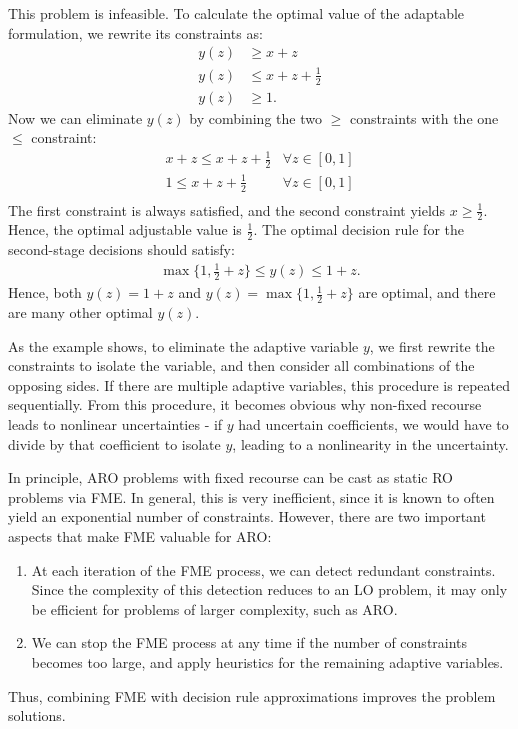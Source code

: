 This problem is infeasible. To calculate the optimal value of the adaptable formulation, we rewrite its constraints as:
\begin{align}
y(z) &\geq x + z \\
y(z) &\leq x+z+\frac{1}{2}\\
y(z) &\geq 1.
\end{align}
Now we can eliminate $y(z)$ by combining the two $\geq$ constraints with the one $\leq$ constraint:
\begin{align}
 x + z \leq x+z+\frac{1}{2} &\forall z\in [0,1]\\
1 \leq x+z+\frac{1}{2} &\forall z\in [0,1]\\
\end{align}
The first constraint is always satisfied, and the second constraint yields $x\geq \frac{1}{2}$. Hence, the optimal adjustable value is $\frac{1}{2}$. The optimal decision rule for the second-stage decisions should satisfy:
\begin{align*}
\max\{ 1,\frac{1}{2}+z\} \leq y(z) \leq 1+z.
\end{align*}
Hence, both $y(z) = 1+z$ and $y(z) = \max \{1,\frac{1}{2}+z\}$ are optimal, and there are many other optimal $y(z)$.


As the example shows, to eliminate the adaptive variable $y$, we first rewrite the constraints to isolate the variable, and then consider all combinations of the opposing sides. If there are multiple adaptive variables, this procedure is repeated sequentially. From this procedure, it becomes obvious why non-fixed recourse leads to nonlinear uncertainties - if $y$ had uncertain coefficients, we would have to divide by that coefficient to isolate $y$, leading to a nonlinearity in the uncertainty.

In principle, ARO problems with fixed recourse can be cast as static RO problems via FME. In general, this is very inefficient, since it is known to often yield an exponential number of constraints. However, there are two important aspects that make FME valuable for ARO:
\begin{enumerate}
	\item At each iteration of the FME process, we can detect redundant constraints. Since the complexity of this detection reduces to an LO problem, it may only be efficient for problems of larger complexity, such as ARO.
	\item We can stop the FME process at any time if the number of constraints becomes too large, and apply heuristics for the remaining adaptive variables.
\end{enumerate}
Thus, combining FME with decision rule approximations improves the problem solutions.

